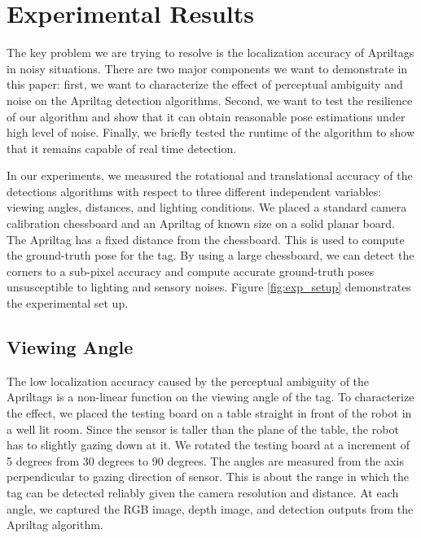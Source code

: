 \section{Experimental Results}
\label{sec:res}
The key problem we are trying to resolve is the localization accuracy of Apriltags in noisy situations. There are two major components we want to demonstrate in this paper: first, we want to characterize the effect of perceptual ambiguity and noise on the Apriltag detection algorithms. Second, we want to test the resilience of our algorithm and show that it can obtain reasonable pose estimations under high level of noise. Finally, we briefly tested the runtime of the algorithm to show that it remains capable of real time detection. 

In our experiments, we measured the rotational and translational accuracy of the detections algorithms with respect to three different independent variables: viewing angles, distances, and lighting conditions. We placed a standard camera calibration chessboard and an Apriltag of known size on a solid planar board. The Apriltag has a fixed distance from the chessboard. This is used to compute the ground-truth pose for the tag. By using a large chessboard, we can detect the corners to a sub-pixel accuracy and compute accurate ground-truth poses unsusceptible to lighting and sensory noises. Figure \ref{fig:exp_setup} demonstrates the experimental set up. 

\subsection{Viewing Angle}
The low localization accuracy caused by the perceptual ambiguity of the Apriltags is a non-linear function on the viewing angle of the tag. To characterize the effect, we placed the testing board on a table straight in front of the robot in a well lit room. Since the sensor is taller than the plane of the table, the robot has to slightly gazing down at it.  We rotated the testing board at a increment of 5 degrees from 30 degrees to 90 degrees. The angles are measured from the axis perpendicular to gazing direction of sensor. This is about the range in which the tag can be detected reliably given the camera resolution and distance. At each angle, we captured the RGB image, depth image, and detection outputs from the Apriltag algorithm. 

